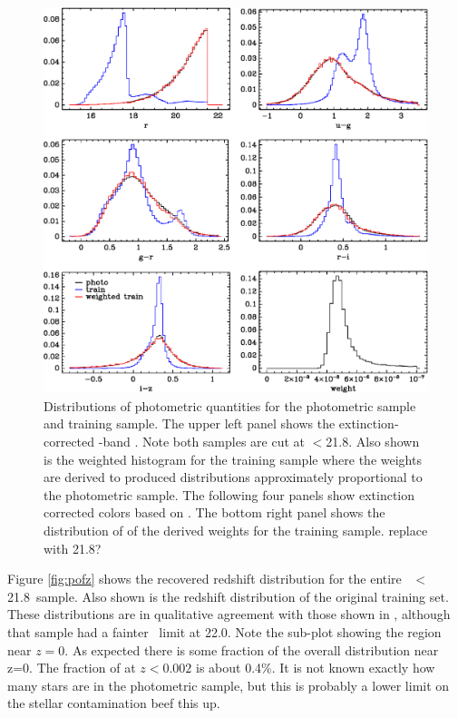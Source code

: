 \documentclass[preprint]{aastex}
\newcommand{\rmax}{21.8}
\begin{document}
\begin{figure}[t] \centering
    \includegraphics{figures/zweight-09-varhist.eps}

    \caption{Distributions of photometric quantities for the photometric sample
    and training sample.  The upper left panel shows the extinction-corrected
    \rmag-band \cmodelmag.  Note both samples are cut at \rmag$ < $\rmax.  
    Also shown is the weighted histogram for the training sample where
    the weights are derived to produced distributions approximately 
    proportional to the photometric sample.
    The following four panels show extinction corrected colors based on
    \modelmag.  The bottom right panel shows the distribution of of the
    derived weights for the training sample. {\color{red} replace with 21.8?}}
    \label{fig:varhist}

    \vspace{2em}
\end{figure}

Figure \ref{fig:pofz} shows the recovered redshift distribution for the entire
\rmag\ $<$ \rmax\ sample.  Also shown is the redshift distribution of the
original training set.  These distributions are in qualitative agreement with
those shown in \citet{CunhaPhotoz09}, although that sample had a fainter \rmag\
limit at 22.0.  Note the sub-plot showing the region near $z=0$.  As expected
there is some fraction of the overall distribution near z=0.  The fraction of
at $z < 0.002$ is about 0.4\%.  It is not known exactly how many stars are in
the photometric sample, but this is probably a lower limit on the stellar
contamination {\color{red}beef this up}.
\end{document}
